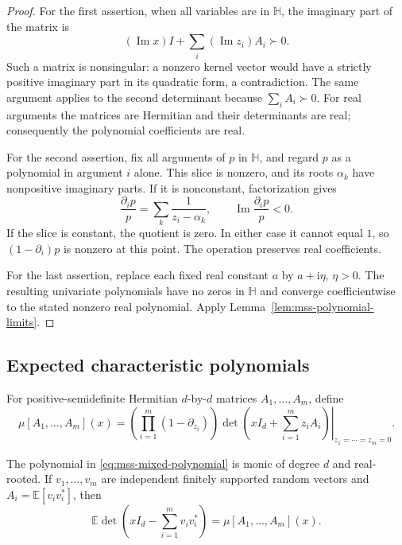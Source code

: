 \begin{proof}
For the first assertion, when all variables are in $\mathbb H$,
the imaginary part of the matrix is
\[
 (\operatorname{Im}x)I+\sum_i(\operatorname{Im}z_i)A_i\succ0.
\]
Such a matrix is nonsingular: a nonzero kernel vector would have a
strictly positive imaginary part in its quadratic form, a
contradiction.  The same argument applies to the second determinant
because $\sum_iA_i\succ0$.  For real arguments the matrices are
Hermitian and their determinants are real; consequently the
polynomial coefficients are real.

For the second assertion, fix all arguments of $p$ in $\mathbb H$,
and regard $p$ as a polynomial in argument $i$ alone.  This slice is
nonzero, and its roots $\alpha_k$ have nonpositive imaginary parts.
If it is nonconstant, factorization gives
\begin{equation}
 \frac{\partial_i p}{p}
   =\sum_k\frac1{z_i-\alpha_k},
 \qquad
 \operatorname{Im}\frac{\partial_i p}{p}<0.
 \label{eq:mss-log-derivative-upper}
\end{equation}
If the slice is constant, the quotient is zero.  In either case it
cannot equal $1$, so $(1-\partial_i)p$ is nonzero at this point.
The operation preserves real coefficients.

For the last assertion, replace each fixed real constant $a$ by
$a+\mathrm i\eta$, $\eta>0$.  The resulting univariate polynomials
have no zeros in $\mathbb H$ and converge coefficientwise to the
stated nonzero real polynomial.  Apply
Lemma~\ref{lem:mss-polynomial-limits}.
\end{proof}

\subsection{Expected characteristic polynomials}

For positive-semidefinite Hermitian $d$-by-$d$ matrices
$A_1,\ldots,A_m$, define
\begin{equation}
 \mu[A_1,\ldots,A_m](x)
 =\left.
   \left(\prod_{i=1}^m(1-\partial_{z_i})\right)
   \det\left(xI_d+\sum_{i=1}^m z_iA_i\right)
   \right|_{z_1=\cdots=z_m=0}.
 \label{eq:mss-mixed-polynomial}
\end{equation}

\begin{lemma}
\label{lem:mss-expectation}
The polynomial in \eqref{eq:mss-mixed-polynomial} is monic of degree
$d$ and real-rooted.  If $v_1,\ldots,v_m$ are independent finitely
supported random vectors and $A_i=\mathbb E[v_iv_i^*]$, then
\begin{equation}
 \mathbb E\det\left(xI_d-\sum_{i=1}^m v_iv_i^*\right)
 =\mu[A_1,\ldots,A_m](x).
 \label{eq:mss-expectation-identity}
\end{equation}
\end{lemma}


